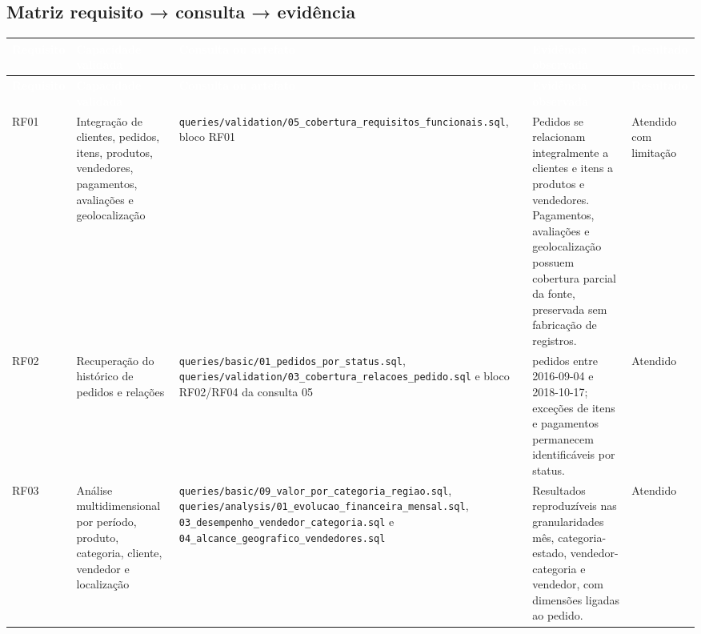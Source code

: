 \documentclass[12pt,a4paper]{article}
\newcounter{none}
\newcommand{\CabecalhoTabela}[1]{\textcolor{white}{\textbf{#1}}}
\begin{document}
\begin{landscape}
\subsection{Matriz requisito → consulta →
evidência}\label{docs__analytics__matriz_validacao_requisitos_funcionais.md__matriz-requisito-consulta-eviduxeancia}
{\def\LTcaptype{none}
\setlength{\tabcolsep}{3pt}
\scriptsize
{}
\begin{longtable}{|>{\RaggedRight\arraybackslash}p{1.7cm}|>{\RaggedRight\arraybackslash}p{4.1cm}|>{\RaggedRight\arraybackslash}p{5.3cm}|>{\RaggedRight\arraybackslash}p{9.7cm}|>{\RaggedRight\arraybackslash}p{2.6cm}|}
\hline
\rowcolor{AzulCorporativo}
\CabecalhoTabela{Requisito} &
\CabecalhoTabela{Capacidade validada} &
\CabecalhoTabela{Consulta ou artefato} &
\CabecalhoTabela{Evidência observada} &
\CabecalhoTabela{Resultado} \\ \hline
\endfirsthead
\hline
\rowcolor{AzulCorporativo}
\CabecalhoTabela{Requisito} &
\CabecalhoTabela{Capacidade validada} &
\CabecalhoTabela{Consulta ou artefato} &
\CabecalhoTabela{Evidência observada} &
\CabecalhoTabela{Resultado} \\ \hline
\endhead
\hline
\endfoot
RF01 & Integração de clientes, pedidos, itens, produtos, vendedores,
pagamentos, avaliações e geolocalização &
\nolinkurl{queries/validation/05_cobertura_requisitos_funcionais.sql},
bloco RF01 & Pedidos se relacionam integralmente a clientes e itens a
produtos e vendedores. Pagamentos, avaliações e geolocalização possuem
cobertura parcial da fonte, preservada sem fabricação de registros. &
Atendido com limitação \\
RF02 & Recuperação do histórico de pedidos e relações &
\nolinkurl{queries/basic/01_pedidos_por_status.sql},
\nolinkurl{queries/validation/03_cobertura_relacoes_pedido.sql} e bloco
RF02/RF04 da consulta 05 & 99.441 pedidos entre 2016-09-04 e 2018-10-17;
exceções de itens e pagamentos permanecem identificáveis por status. &
Atendido \\
RF03 & Análise multidimensional por período, produto, categoria,
cliente, vendedor e localização &
\nolinkurl{queries/basic/09_valor_por_categoria_regiao.sql},
\nolinkurl{queries/analysis/01_evolucao_financeira_mensal.sql},
\nolinkurl{03_desempenho_vendedor_categoria.sql} e
\nolinkurl{04_alcance_geografico_vendedores.sql} & Resultados
reproduzíveis nas granularidades mês, categoria-estado,
vendedor-categoria e vendedor, com dimensões ligadas ao pedido. &
Atendido \\

\end{longtable}}
\end{landscape}
\end{document}
